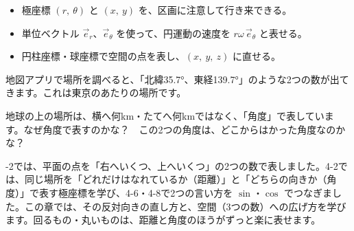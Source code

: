 
\begin{goal}
\begin{itemize}[label={\color{\bkTT}●}, leftmargin=1.6\zw, itemsep=0pt, topsep=1pt]
\item {}\enspace 極座標 $(r,\ \theta)$ と $(x,\ y)$ を、区画に注意して行き来できる。
\item {}\enspace 単位ベクトル $\vec e_r$、$\vec e_\theta$ を使って、円運動の速度を $r\omega\,\vec e_\theta$ と表せる。
\item {}\enspace 円柱座標・球座標で空間の点を表し、$(x,\ y,\ z)$ に直せる。
\end{itemize}
\end{goal}

\begin{hatena}
\noindent\begin{minipage}[c]{0.6\linewidth}
地図アプリで場所を調べると、「北緯35.7°、東経139.7°」のような2つの数が出てきます。これは東京のあたりの場所です。

地球の上の場所は、横へ何km・たてへ何kmではなく、「角度」で表しています。なぜ角度で表すのかな？　この2つの角度は、どこからはかった角度なのかな？
\end{minipage}\hfill
\begin{minipage}[c]{0.36\linewidth}
\centering
{}
\end{minipage}
\end{hatena}

-2では、平面の点を「右へいくつ、上へいくつ」の2つの数で表しました。4-2では、同じ場所を「どれだけはなれているか（距離）」と「どちらの向きか（角度）」で表す極座標を学び、4-6・4-8で2つの言い方を $\sin$・$\cos$ でつなぎました。この章では、その反対向きの直し方と、空間（3つの数）への広げ方を学びます。回るもの・丸いものは、距離と角度のほうがずっと楽に表せます。

